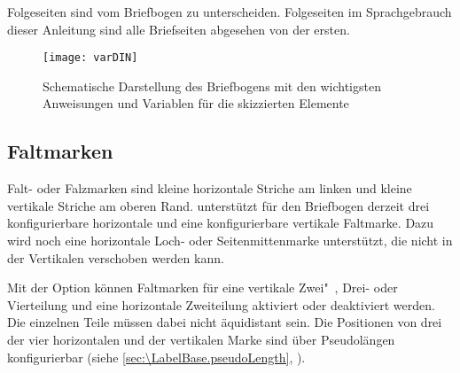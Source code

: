 Folgeseiten sind vom Briefbogen zu
unterscheiden. Folgeseiten im Sprachgebrauch dieser Anleitung sind alle
Briefseiten abgesehen von der ersten.


\begin{figure}
  \centering
  \texttt{[image: varDIN]}
  \caption{Schematische Darstellung des Briefbogens mit den wichtigsten
    Anweisungen und Variablen für die skizzierten Elemente}
  \label{fig:\LabelBase.variables}
\end{figure}


\subsection{Faltmarken}
\BeginIndexGroup
{}%

Falt- oder Falzmarken sind kleine horizontale Striche am linken und kleine
vertikale Striche am oberen Rand. \KOMAScript{} unterstützt für den Briefbogen
derzeit drei konfigurierbare horizontale und eine konfigurierbare vertikale
Faltmarke. Dazu wird noch eine horizontale Loch- oder Seitenmittenmarke
unterstützt, die nicht in der Vertikalen verschoben werden kann.

\begin{Declaration}
\end{Declaration}
Mit der Option  können Faltmarken für eine
vertikale Zwei"~, Drei- oder Vierteilung und eine horizontale Zweiteilung
aktiviert oder deaktiviert werden. Die einzelnen Teile müssen dabei nicht
äquidistant sein. Die Positionen von drei der vier horizontalen und der
vertikalen Marke sind über Pseudolängen konfigurierbar (siehe
\autoref{sec:\LabelBase.pseudoLength},
).

